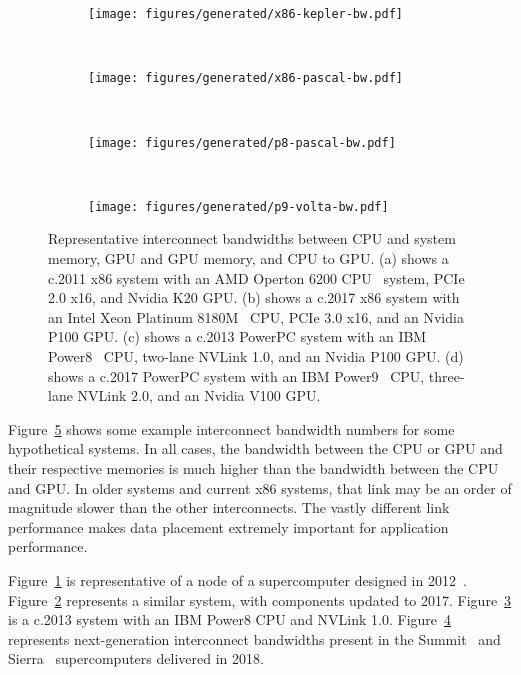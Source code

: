 \begin{figure}[ht]
    \centering
    \begin{subfigure}[b]{0.2\textwidth}
        \texttt{[image: figures/generated/x86-kepler-bw.pdf]}
        \caption{}
        \label{fig:x86-kepler-bw}
    \end{subfigure}
	~
	\begin{subfigure}[b]{0.2\textwidth}
        \texttt{[image: figures/generated/x86-pascal-bw.pdf]}
        \caption{}
        \label{fig:x86-pascal-bw}
    \end{subfigure}
    ~
    \begin{subfigure}[b]{0.2\textwidth}
        \texttt{[image: figures/generated/p8-pascal-bw.pdf]}
        \caption{}
        \label{fig:p8-pascal-bw}
    \end{subfigure}
    ~
    \begin{subfigure}[b]{0.2\textwidth}
        \texttt{[image: figures/generated/p9-volta-bw.pdf]}
        \caption{}
        \label{fig:p9-volta-bw}
    \end{subfigure}
	\caption[Example system interconnect bandwidths]{
		Representative interconnect bandwidths between CPU and system memory, GPU and GPU memory, and CPU to GPU.
		(a) shows a c.2011 x86 system with an AMD Operton 6200 CPU~\cite{amd2012opteron6200} system, PCIe 2.0 x16, and Nvidia K20 GPU.
		(b) shows a c.2017 x86 system with an Intel Xeon Platinum 8180M~\cite{intel20188180m} CPU, PCIe 3.0 x16, and an Nvidia P100 GPU.
		(c) shows a c.2013 PowerPC system with an IBM Power8~\cite{stuechli2013power8} CPU, two-lane NVLink 1.0, and an Nvidia P100 GPU.
		(d) shows a c.2017 PowerPC system with an IBM Power9~\cite{thompto2016power9} CPU, three-lane NVLink 2.0, and an Nvidia V100 GPU.
	}
    \label{fig:gpu-sys-arch}
\end{figure}

Figure~\ref{fig:gpu-sys-arch} shows some example interconnect bandwidth numbers for some hypothetical systems.
In all cases, the bandwidth between the CPU or GPU and their respective memories is much higher than the bandwidth between the CPU and GPU.
In older systems and current x86 systems, that link may be an order of magnitude slower than the other interconnects.
The vastly different link performance makes data placement extremely important for application performance.

Figure~\ref{fig:x86-kepler-bw} is representative of a node of a supercomputer designed in 2012~\cite{ncsa2018bluewaters}.
Figure~\ref{fig:x86-pascal-bw} represents a similar system, with components updated to 2017.
Figure~\ref{fig:p8-pascal-bw} is a c.2013 system with an IBM Power8 CPU and NVLink 1.0.
Figure~\ref{fig:p9-volta-bw} represents next-generation interconnect bandwidths present in the Summit~\cite{ornl2018summit} and Sierra~\cite{llnl2018sierra} supercomputers delivered in 2018.

